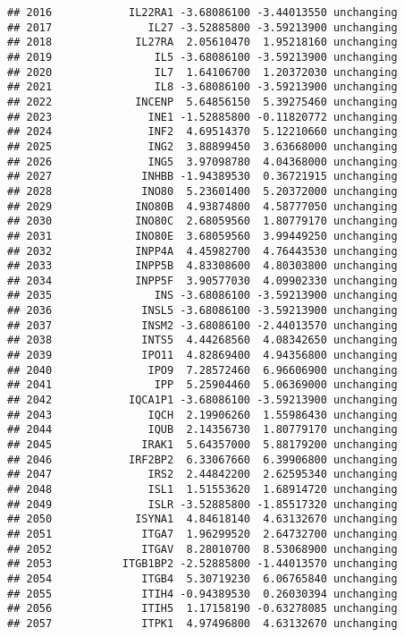 \documentclass[]{article}
\begin{document}
\begin{verbatim}
## 2016            IL22RA1 -3.68086100 -3.44013550 unchanging
## 2017               IL27 -3.52885800 -3.59213900 unchanging
## 2018             IL27RA  2.05610470  1.95218160 unchanging
## 2019                IL5 -3.68086100 -3.59213900 unchanging
## 2020                IL7  1.64106700  1.20372030 unchanging
## 2021                IL8 -3.68086100 -3.59213900 unchanging
## 2022             INCENP  5.64856150  5.39275460 unchanging
## 2023               INE1 -1.52885800 -0.11820772 unchanging
## 2024               INF2  4.69514370  5.12210660 unchanging
## 2025               ING2  3.88899450  3.63668000 unchanging
## 2026               ING5  3.97098780  4.04368000 unchanging
## 2027              INHBB -1.94389530  0.36721915 unchanging
## 2028              INO80  5.23601400  5.20372000 unchanging
## 2029             INO80B  4.93874800  4.58777050 unchanging
## 2030             INO80C  2.68059560  1.80779170 unchanging
## 2031             INO80E  3.68059560  3.99449250 unchanging
## 2032             INPP4A  4.45982700  4.76443530 unchanging
## 2033             INPP5B  4.83308600  4.80303800 unchanging
## 2034             INPP5F  3.90577030  4.09902330 unchanging
## 2035                INS -3.68086100 -3.59213900 unchanging
## 2036              INSL5 -3.68086100 -3.59213900 unchanging
## 2037              INSM2 -3.68086100 -2.44013570 unchanging
## 2038              INTS5  4.44268560  4.08342650 unchanging
## 2039              IPO11  4.82869400  4.94356800 unchanging
## 2040               IPO9  7.28572460  6.96606900 unchanging
## 2041                IPP  5.25904460  5.06369000 unchanging
## 2042            IQCA1P1 -3.68086100 -3.59213900 unchanging
## 2043               IQCH  2.19906260  1.55986430 unchanging
## 2044               IQUB  2.14356730  1.80779170 unchanging
## 2045              IRAK1  5.64357000  5.88179200 unchanging
## 2046            IRF2BP2  6.33067660  6.39906800 unchanging
## 2047               IRS2  2.44842200  2.62595340 unchanging
## 2048               ISL1  1.51553620  1.68914720 unchanging
## 2049               ISLR -3.52885800 -1.85517320 unchanging
## 2050             ISYNA1  4.84618140  4.63132670 unchanging
## 2051              ITGA7  1.96299520  2.64732700 unchanging
## 2052              ITGAV  8.28010700  8.53068900 unchanging
## 2053           ITGB1BP2 -2.52885800 -1.44013570 unchanging
## 2054              ITGB4  5.30719230  6.06765840 unchanging
## 2055              ITIH4 -0.94389530  0.26030394 unchanging
## 2056              ITIH5  1.17158190 -0.63278085 unchanging
## 2057              ITPK1  4.97496800  4.63132670 unchanging

\end{verbatim}
\end{document}
